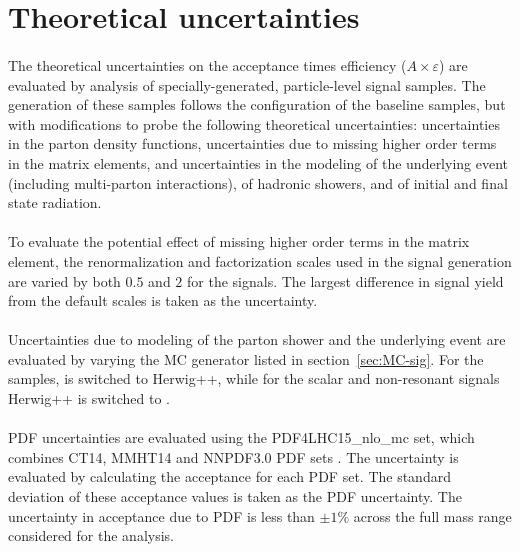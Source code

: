 \section{Theoretical uncertainties}
\label{sec:boosted-systematics-theory}
\paragraph{}
The theoretical uncertainties on the acceptance times efficiency ($A\times\varepsilon$) are evaluated by analysis of specially-generated, particle-level signal samples. 
The generation of these samples follows the configuration of the baseline samples, but with modifications to probe the following theoretical uncertainties: uncertainties in the parton density functions, uncertainties due to missing higher order terms in the matrix elements, and uncertainties in the modeling of the underlying event (including multi-parton interactions), of hadronic showers, and of initial and final state radiation.

\paragraph{}
To evaluate the potential effect of missing higher order terms in the matrix element, the renormalization and factorization scales used in the signal generation are varied by both $0.5$ and $2$ for the signals.
The largest difference in signal yield from the default scales is taken as the uncertainty.

\paragraph{}
Uncertainties due to modeling of the parton shower and the underlying event are evaluated by varying the MC generator listed in section~\ref{sec:MC-sig}. 
For the \Grav~ samples,  is switched to Herwig++, while for the scalar and non-resonant signals Herwig++ is switched to .

\paragraph{}
PDF uncertainties are evaluated using the PDF4LHC15\_nlo\_mc set, which combines CT14, MMHT14 and NNPDF3.0 PDF sets \cite{0954-3899-43-2-023001}. 
The uncertainty is evaluated by calculating the acceptance for each PDF set. 
The standard deviation of these acceptance values is taken as the PDF uncertainty.
The uncertainty in acceptance due to PDF is less than $\pm1\%$ across the full mass range considered for the analysis.

